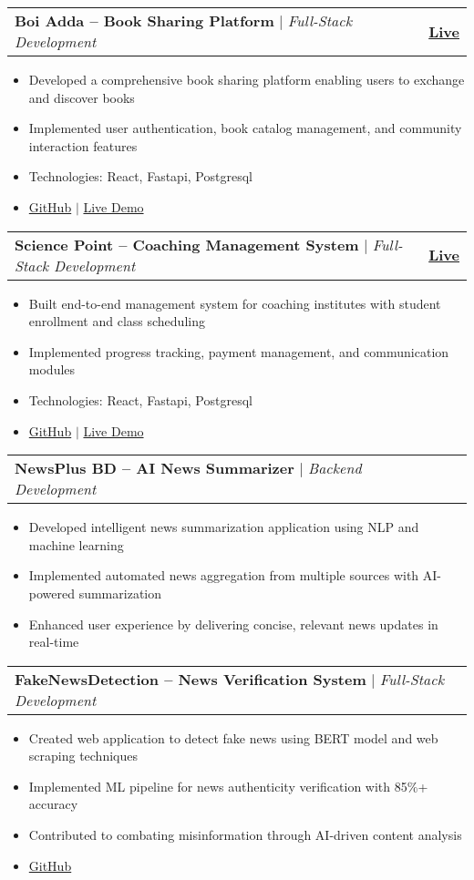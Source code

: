 \documentclass[letterpaper,11pt]{article}
\makeatletter
\newcommand{\resumeItem}[1]{
  \item\small{
    {#1 \vspace{-2pt}}
  }
}
\newcommand{\resumeProjectHeading}[2]{
    \item
    \begin{tabular*}{1.001\textwidth}{l@{\extracolsep{\fill}}r}
      \small#1 & \textbf{\small #2}\\
    \end{tabular*}\vspace{-7pt}
}
\newcommand{\resumeItemListStart}{\begin{itemize}}
\newcommand{\resumeItemListEnd}{\end{itemize}\vspace{-5pt}}
\makeatother
\begin{document}
      \resumeProjectHeading
          {\textbf{Boi Adda -- Book Sharing Platform} $|$ \emph{Full-Stack Development}}{\href{https://boi-adda.onrender.com}{Live}}
          \resumeItemListStart
            \resumeItem{Developed a comprehensive book sharing platform enabling users to exchange and discover books}
            \resumeItem{Implemented user authentication, book catalog management, and community interaction features}
            \resumeItem{Technologies: React, Fastapi, Postgresql}
            \resumeItem{\href{https://github.com/NightFury-9b71/boi-adda}{GitHub} $|$ \href{https://boi-adda.onrender.com}{Live Demo}}
          \resumeItemListEnd
          \vspace{-13pt}
          
      \resumeProjectHeading
          {\textbf{Science Point -- Coaching Management System} $|$ \emph{Full-Stack Development}}{\href{https://science-point.onrender.com}{Live}}
          \resumeItemListStart
            \resumeItem{Built end-to-end management system for coaching institutes with student enrollment and class scheduling}
            \resumeItem{Implemented progress tracking, payment management, and communication modules}
            \resumeItem{Technologies: React, Fastapi, Postgresql}
            \resumeItem{\href{https://github.com/NightFury-9b71/science-point}{GitHub} $|$ \href{https://science-point.onrender.com}{Live Demo}}
          \resumeItemListEnd
          \vspace{-13pt}
          
      \resumeProjectHeading
          {\textbf{NewsPlus BD -- AI News Summarizer} $|$ \emph{Backend Development}}{}
          \resumeItemListStart
            \resumeItem{Developed intelligent news summarization application using NLP and machine learning}
            \resumeItem{Implemented automated news aggregation from multiple sources with AI-powered summarization}
            \resumeItem{Enhanced user experience by delivering concise, relevant news updates in real-time}
          \resumeItemListEnd
          \vspace{-13pt}
          
      \resumeProjectHeading
          {\textbf{FakeNewsDetection -- News Verification System} $|$ \emph{Full-Stack Development}}{}
          \resumeItemListStart
            \resumeItem{Created web application to detect fake news using BERT model and web scraping techniques}
            \resumeItem{Implemented ML pipeline for news authenticity verification with 85\%+ accuracy}
            \resumeItem{Contributed to combating misinformation through AI-driven content analysis}
            \resumeItem{\href{https://github.com/NightFury-9b71/FakeNewsDetection}{GitHub}}
          \resumeItemListEnd
          \vspace{-13pt}
          
\end{document}

